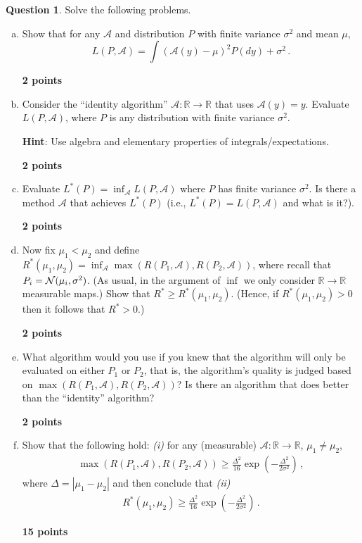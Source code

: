 \documentclass{article}
\newcommand{\R}{\mathbb{R}}
\DeclareMathOperator*{\1}{\mathbbm{1}}
\newcounter{DocPoints}
\newcounter{QuestionPoints}
\newcommand{\points}[1]{	\par\mbox{}\par\noindent\hfill {\bf #1 points}	\addtocounter{DocPoints}{#1}
	\addtocounter{QuestionPoints}{#1}
}
\theoremstyle{definition}
\newtheorem{question}{Question}
\theoremstyle{remark}
\newcommand{\hint}{\noindent \textbf{Hint}:\xspace}
\newcommand{\cA}{\mathcal{A}}
\begin{document}
\begin{question}
Solve the following problems.
\begin{enumerate}[(a)]

\item \label{p:regid} Show that for any $\cA$ and distribution 
$P$ with finite variance $\sigma^2$ and mean $\mu$, 
\[
L(P,\cA) = \int (\cA(y)-\mu)^2 P(dy) + \sigma^2\,.
\]

\points{2}
\item 
Consider the ``identity algorithm'' $\cA: \R \to \R$ that uses $\cA(y)=y$. Evaluate $L(P,\cA)$, where $P$ is any distribution with finite variance $\sigma^2$. 

\hint Use algebra and elementary properties of integrals/expectations.
\points{2}

\item Evaluate $L^*(P) = \inf_{\cA} L(P,\cA)$ where $P$ has finite variance $\sigma^2$. Is there a method $\cA$ that achieves $L^*(P)$ (i.e., $L^*(P) = L(P,\cA)$ and what is it?).

\points{2}


\item Now fix $\mu_1<\mu_2$ and define 
$R^*(\mu_1,\mu_2) = \inf_{\cA} \max( R(P_1,\cA),R(P_2,\cA))$, 
where recall that $P_i = \mathcal{N}(\mu_i,\sigma^2)$. (As usual, in the argument of $\inf$ we only consider $\R\to\R$ measurable maps.)
Show that $R^* \ge R^*(\mu_1,\mu_2)$. (Hence, if $R^*(\mu_1,\mu_2)>0$ then it follows that $R^*>0$.)
\points{2}

\item What algorithm would you use if you knew that the algorithm will only be evaluated on either $P_1$ or $P_2$, that is, the algorithm's quality is judged based on $\max (R(P_1,\cA),R(P_2,\cA))$? Is there an algorithm that does better than the ``identity'' algorithm?
\points{2}

\item Show that the following hold:
\emph{(i)} for any (measurable) $\cA:\R \to \R$, $\mu_1\ne \mu_2$,
\begin{align*}
 \max( R(P_1,\cA),R(P_2,\cA))\ge \frac{\Delta^2}{16} \exp\left(-\tfrac{\Delta^2}{2\sigma^2}\right)\,,
\end{align*}
where $\Delta = |\mu_1-\mu_2|$
and then conclude that \emph{(ii)}
\begin{align*}
R^*(\mu_1,\mu_2)\ge \frac{\Delta^2}{16} \exp\left(-\tfrac{\Delta^2}{2\sigma^2}\right)\,.
\end{align*}


\points{15}


\end{enumerate}
\end{question}
\end{document}
